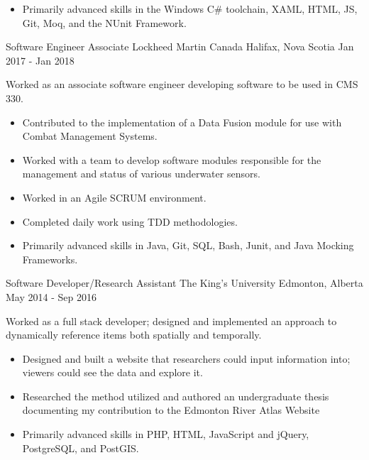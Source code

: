 \begin{cventries}
{\begin{itemize}
                \item Primarily advanced skills in the Windows C\# toolchain, XAML, HTML, JS, Git, Moq, and the NUnit Framework.
            \end{itemize}
        }
    \cventry
        {Software Engineer Associate}
        {Lockheed Martin Canada}
        {Halifax, Nova Scotia}
        {Jan 2017 - Jan 2018}
        {
            Worked as an associate software engineer developing software to be used in CMS 330.
            \begin{itemize}
                \item Contributed to the implementation of a Data Fusion module for use with Combat Management Systems.
                \item Worked with a team to develop software modules responsible for the management and status of various underwater sensors.
                \item Worked in an Agile SCRUM environment.
                \item Completed daily work using TDD methodologies.
                \item Primarily advanced skills in Java, Git, SQL, Bash, Junit, and Java Mocking Frameworks.
            \end{itemize}
        }
    \cventry
        {Software Developer/Research Assistant}
        {The King's University}
        {Edmonton, Alberta}
        {May 2014 - Sep 2016}
        {
            Worked as a full stack developer; designed and implemented an approach to dynamically reference items both spatially and temporally.
            \begin{itemize}
                \item Designed and built a website that researchers could input information into; viewers could see the data and explore it.
                \item Researched the method utilized and authored an undergraduate thesis documenting my contribution to the Edmonton River Atlas
                Website
                \item Primarily advanced skills in PHP, HTML, JavaScript and jQuery, PostgreSQL, and PostGIS.
            \end{itemize}
        }

\end{cventries}